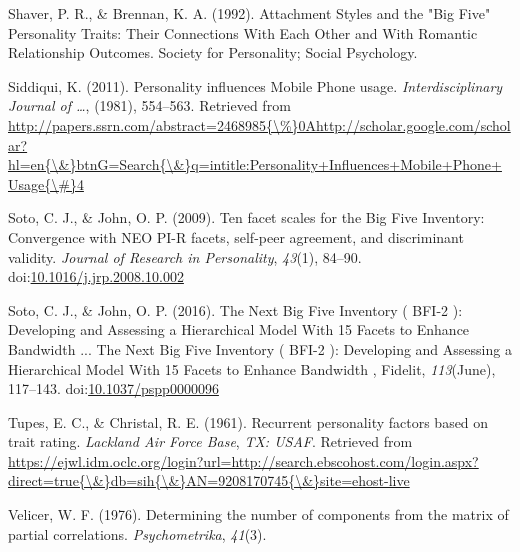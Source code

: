 \documentclass[,man,floatsintext]{apa6}
\theoremstyle{definition}
\theoremstyle{definition}
\theoremstyle{definition}
\theoremstyle{remark}
\begin{document}
\leavevmode\hypertarget{ref-Shaver1992}{}%
Shaver, P. R., \& Brennan, K. A. (1992). Attachment Styles and the "Big
Five" Personality Traits: Their Connections With Each Other and With
Romantic Relationship Outcomes. Society for Personality; Social
Psychology.

\leavevmode\hypertarget{ref-Siddiqui2011}{}%
Siddiqui, K. (2011). Personality influences Mobile Phone usage.
\emph{Interdisciplinary Journal of \ldots{}}, (1981), 554--563.
Retrieved from
\href{http://papers.ssrn.com/abstract=2468985\%7B/\%\%7D0Ahttp://scholar.google.com/scholar?hl=en\%7B/\&\%7DbtnG=Search\%7B/\&\%7Dq=intitle:Personality+Influences+Mobile+Phone+Usage\%7B/\#\%7D4}{http://papers.ssrn.com/abstract=2468985\{\textbackslash{}\%\}0Ahttp://scholar.google.com/scholar?hl=en\{\textbackslash{}\&\}btnG=Search\{\textbackslash{}\&\}q=intitle:Personality+Influences+Mobile+Phone+Usage\{\textbackslash{}\#\}4}

\leavevmode\hypertarget{ref-SotoJohn2009}{}%
Soto, C. J., \& John, O. P. (2009). Ten facet scales for the Big Five
Inventory: Convergence with NEO PI-R facets, self-peer agreement, and
discriminant validity. \emph{Journal of Research in Personality},
\emph{43}(1), 84--90.
doi:\href{https://doi.org/10.1016/j.jrp.2008.10.002}{10.1016/j.jrp.2008.10.002}

\leavevmode\hypertarget{ref-SotoJohn2016}{}%
Soto, C. J., \& John, O. P. (2016). The Next Big Five Inventory ( BFI-2
): Developing and Assessing a Hierarchical Model With 15 Facets to
Enhance Bandwidth ... The Next Big Five Inventory ( BFI-2 ): Developing
and Assessing a Hierarchical Model With 15 Facets to Enhance Bandwidth ,
Fidelit, \emph{113}(June), 117--143.
doi:\href{https://doi.org/10.1037/pspp0000096}{10.1037/pspp0000096}

\leavevmode\hypertarget{ref-TupesChristal1961}{}%
Tupes, E. C., \& Christal, R. E. (1961). Recurrent personality factors
based on trait rating. \emph{Lackland Air Force Base}, \emph{TX: USAF}.
Retrieved from
\href{https://ejwl.idm.oclc.org/login?url=http://search.ebscohost.com/login.aspx?direct=true\%7B/\&\%7Ddb=sih\%7B/\&\%7DAN=9208170745\%7B/\&\%7Dsite=ehost-live}{https://ejwl.idm.oclc.org/login?url=http://search.ebscohost.com/login.aspx?direct=true\{\textbackslash{}\&\}db=sih\{\textbackslash{}\&\}AN=9208170745\{\textbackslash{}\&\}site=ehost-live}

\leavevmode\hypertarget{ref-Velicer1976}{}%
Velicer, W. F. (1976). Determining the number of components from the
matrix of partial correlations. \emph{Psychometrika}, \emph{41}(3).
\end{document}
